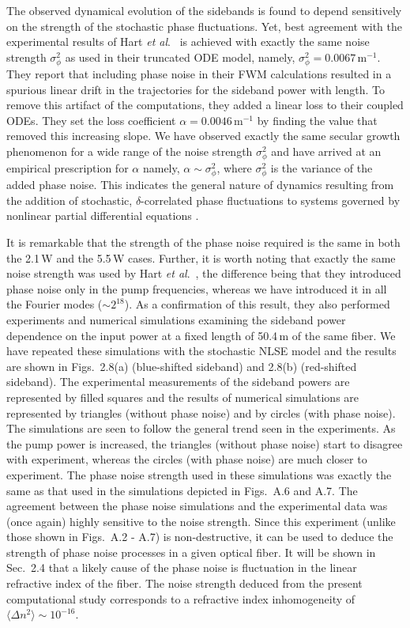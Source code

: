 The observed dynamical evolution of the sidebands is found to depend
sensitively on the strength of the stochastic phase fluctuations. Yet, best
agreement with the experimental results of Hart {\it et al}.\ \cite{hart1} is
achieved with exactly the same noise strength $\sigma^2_\phi$ as used in
their truncated ODE model, namely, $\sigma^2_\phi = 0.0067$\,m$^{-1}$. They
report that including phase noise in their FWM calculations resulted in a
spurious linear drift in the trajectories for the sideband power with length.
To remove this artifact of the computations, they added a linear loss to their
coupled ODEs. They set the loss coefficient $\alpha = 0.0046$\,m$^{-1}$ by
finding the value that removed this increasing slope. We have observed exactly
the same secular growth phenomenon for a wide range of the noise strength
$\sigma^2_\phi$ and have arrived at an empirical prescription for $\alpha$
namely, $\alpha\sim\sigma^2_\phi$, where $\sigma^2_\phi$ is the
variance of the added phase noise. This indicates the general nature of
dynamics resulting from the addition of stochastic, $\delta$-correlated phase
fluctuations to systems governed by nonlinear partial differential equations
\cite{risken}.

It is remarkable that the strength of the phase noise required is the same in
both the 2.1\,W and the 5.5\,W cases. Further, it is worth noting that exactly
the same noise strength was used by Hart {\it et al}.\ \cite{hart1}, the difference
being that they introduced phase noise only in the pump frequencies, whereas
we have introduced it in all the Fourier modes ($\sim2^{18}$). As a
confirmation of this result, they also performed experiments and numerical
simulations examining the sideband power dependence on the input power at a
fixed length of 50.4\,m of the same fiber. We have repeated these simulations
with the stochastic NLSE model and the results are shown in Figs.\ 2.8(a)
(blue-shifted sideband) and 2.8(b) (red-shifted sideband). The experimental
measurements of the sideband powers are represented by filled squares and the
results of numerical simulations are represented by triangles (without phase
noise) and by circles (with phase noise). The simulations are seen to follow
the general trend seen in the experiments. As the pump power is increased, the
triangles (without phase noise) start to disagree with experiment, whereas the
circles (with phase noise) are much closer to experiment. The phase noise
strength used in these simulations was exactly the same as that used in the
simulations depicted in Figs.\ A.6 and A.7. The agreement between the phase noise
simulations and the experimental data was (once again) highly sensitive to the
noise strength. Since this experiment (unlike those shown in Figs.\ A.2 - A.7)
is non-destructive, it can be used to deduce the strength of phase noise
processes in a given optical fiber. It will be shown in Sec.\ 2.4 that a
likely cause of the phase noise is fluctuation in the linear refractive index
of the fiber. The noise strength deduced from the present computational study
corresponds to a refractive index inhomogeneity of
$\langle \Delta n^{2} \rangle \sim 10^{-16}$.

